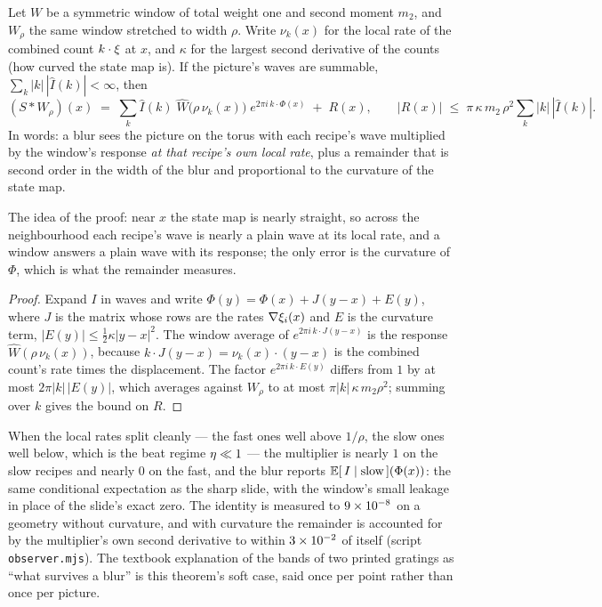 \begin{theorem}
\label{thm:multiplier}
Let $W$ be a symmetric window of total weight one and second moment $m_2$,
and $W_\rho$ the same window stretched to width $\rho$. Write $\nu_k(x)$ for
the local rate of the combined count $k\cdot\xi$ at $x$, and $\kappa$ for
the largest second derivative of the counts (how curved the state map is).
If the picture's waves are summable, $\sum_k|k|\,|\hat I(k)|<\infty$, then
\[
  (S*W_\rho)(x)\;=\;\sum_k \hat I(k)\;\widehat W\!\big(\rho\,\nu_k(x)\big)\;
  e^{2\pi i\,k\cdot\Phi(x)}\;+\;R(x),
  \qquad
  |R(x)|\;\le\;\pi\,\kappa\,m_2\,\rho^2\sum_k|k|\,|\hat I(k)| .
\]
In words: a blur sees the picture on the torus with each recipe's wave
multiplied by the window's response \emph{at that recipe's own local rate},
plus a remainder that is second order in the width of the blur and
proportional to the curvature of the state map.
\end{theorem}

The idea of the proof: near $x$ the state map is nearly straight, so across
the neighbourhood each recipe's wave is nearly a plain wave at its local
rate, and a window answers a plain wave with its response; the only error
is the curvature of $\Phi$, which is what the remainder measures.

\begin{proof}
Expand $I$ in waves and write $\Phi(y)=\Phi(x)+J(y-x)+E(y)$, where $J$ is
the matrix whose rows are the rates $\nabla\xi_i(x)$ and $E$ is the
curvature term, $|E(y)|\le\tfrac12\kappa|y-x|^2$. The window average of
$e^{2\pi i\,k\cdot J(y-x)}$ is the response $\widehat W(\rho\,\nu_k(x))$,
because $k\cdot J(y-x)=\nu_k(x)\cdot(y-x)$ is the combined count's rate
times the displacement. The factor $e^{2\pi i\,k\cdot E(y)}$ differs from
$1$ by at most $2\pi|k|\,|E(y)|$, which averages against $W_\rho$ to at most
$\pi|k|\,\kappa\,m_2\rho^2$; summing over $k$ gives the bound on $R$.
\end{proof}

When the local rates split cleanly --- the fast ones well above $1/\rho$,
the slow ones well below, which is the beat regime $\eta\ll1$ --- the
multiplier is nearly $1$ on the slow recipes and nearly $0$ on the fast, and
the blur reports $\mathbb{E}[\,I\mid\text{slow}\,](\Phi(x))$: the same conditional
expectation as the sharp slide, with the window's small leakage in place of
the slide's exact zero. The identity is measured to $9\times 10^{-8}$ on a
geometry without curvature, and with curvature the remainder is accounted
for by the multiplier's own second derivative to within
$3\times 10^{-2}$ of itself (script \texttt{observer.mjs}). The
textbook explanation of the bands of two printed gratings as ``what
survives a blur'' is this theorem's soft case, said once per point rather
than once per picture.

